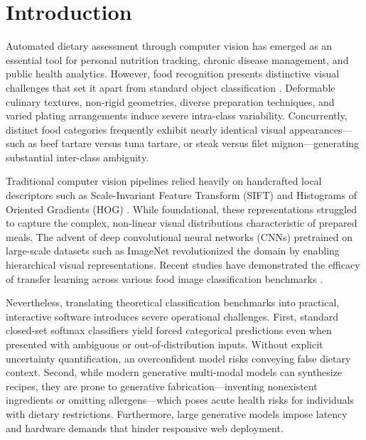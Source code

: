 \documentclass[conference]{IEEEtran}
\begin{document}
\section{Introduction}
Automated dietary assessment through computer vision has emerged as an essential tool for personal nutrition tracking, chronic disease management, and public health analytics. However, food recognition presents distinctive visual challenges that set it apart from standard object classification \cite{food101}. Deformable culinary textures, non-rigid geometries, diverse preparation techniques, and varied plating arrangements induce severe intra-class variability. Concurrently, distinct food categories frequently exhibit nearly identical visual appearances---such as beef tartare versus tuna tartare, or steak versus filet mignon---generating substantial inter-class ambiguity.

Traditional computer vision pipelines relied heavily on handcrafted local descriptors such as Scale-Invariant Feature Transform (SIFT) \cite{lowe2004distinctive} and Histograms of Oriented Gradients (HOG) \cite{dalal2005histograms}. While foundational, these representations struggled to capture the complex, non-linear visual distributions characteristic of prepared meals. The advent of deep convolutional neural networks (CNNs) pretrained on large-scale datasets such as ImageNet \cite{deng2009imagenet} revolutionized the domain by enabling hierarchical visual representations. Recent studies have demonstrated the efficacy of transfer learning across various food image classification benchmarks \cite{suddul2023,abiyev2024,razia2024}.

Nevertheless, translating theoretical classification benchmarks into practical, interactive software introduces severe operational challenges. First, standard closed-set softmax classifiers yield forced categorical predictions even when presented with ambiguous or out-of-distribution inputs. Without explicit uncertainty quantification, an overconfident model risks conveying false dietary context. Second, while modern generative multi-modal models can synthesize recipes, they are prone to generative fabrication---inventing nonexistent ingredients or omitting allergens---which poses acute health risks for individuals with dietary restrictions. Furthermore, large generative models impose latency and hardware demands that hinder responsive web deployment.
\end{document}

